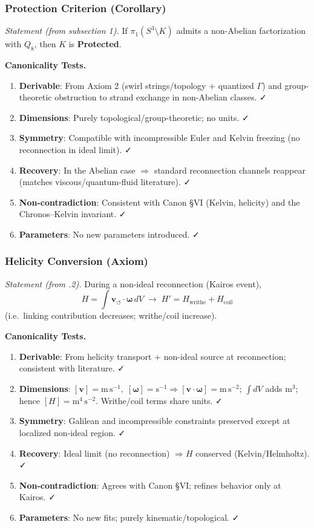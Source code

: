 \subsubsection{Protection Criterion (Corollary)}
\emph{Statement (from subsection 1).} If $\pi_1(S^3\!\setminus\!K)$ admits a non-Abelian factorization with $Q_8$, then $K$ is \textbf{Protected}.

\textbf{Canonicality Tests.}
\begin{enumerate}
    \item \textbf{Derivable}: From Axiom 2 (swirl strings/topology + quantized $\Gamma$) and group-theoretic obstruction to strand exchange in non-Abelian classes. ✓
    \item \textbf{Dimensions}: Purely topological/group-theoretic; no units. ✓
    \item \textbf{Symmetry}: Compatible with incompressible Euler and Kelvin freezing (no reconnection in ideal limit). ✓
    \item \textbf{Recovery}: In the Abelian case $\Rightarrow$ standard reconnection channels reappear (matches viscous/quantum-fluid literature). ✓
    \item \textbf{Non-contradiction}: Consistent with Canon §VI (Kelvin, helicity) and the Chronos–Kelvin invariant. ✓
    \item \textbf{Parameters}: No new parameters introduced. ✓
\end{enumerate}

\subsubsection{Helicity Conversion (Axiom)}
\emph{Statement (from .2).} During a non-ideal reconnection (Kairos event),
\[
    H=\!\int \mathbf{v}_{\!\boldsymbol{\circlearrowleft}}\!\cdot\!\boldsymbol{\omega}\, dV
    \;\to\; H' = H_{\text{writhe}} + H_{\text{coil}}
\]
(i.e.\ linking contribution decreases; writhe/coil increase).

\textbf{Canonicality Tests.}
\begin{enumerate}
    \item \textbf{Derivable}: From helicity transport + non-ideal source at reconnection; consistent with literature. ✓
    \item \textbf{Dimensions}: $[\mathbf{v}]=\mathrm{m\,s^{-1}},\; [\boldsymbol{\omega}]=\mathrm{s^{-1}}\Rightarrow [\mathbf{v}\!\cdot\!\boldsymbol{\omega}]=\mathrm{m\,s^{-2}}$; $\int dV$ adds $\mathrm{m^3}$; hence $[H]=\mathrm{m^4\,s^{-2}}$. Writhe/coil terms share units. ✓
    \item \textbf{Symmetry}: Galilean and incompressible constraints preserved except at localized non-ideal region. ✓
    \item \textbf{Recovery}: Ideal limit (no reconnection) $\Rightarrow H$ conserved (Kelvin/Helmholtz). ✓
    \item \textbf{Non-contradiction}: Agrees with Canon §VI; refines behavior only at Kairos. ✓
    \item \textbf{Parameters}: No new fits; purely kinematic/topological. ✓
\end{enumerate}

